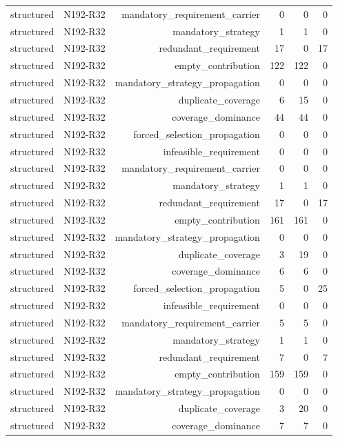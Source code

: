 {\begin{longtable}{lrrrrr}
structured & N192-R32 & mandatory\_requirement\_carrier & 0 & 0 & 0 \\
structured & N192-R32 & mandatory\_strategy & 1 & 1 & 0 \\
structured & N192-R32 & redundant\_requirement & 17 & 0 & 17 \\
structured & N192-R32 & empty\_contribution & 122 & 122 & 0 \\
structured & N192-R32 & mandatory\_strategy\_propagation & 0 & 0 & 0 \\
structured & N192-R32 & duplicate\_coverage & 6 & 15 & 0 \\
structured & N192-R32 & coverage\_dominance & 44 & 44 & 0 \\
structured & N192-R32 & forced\_selection\_propagation & 0 & 0 & 0 \\
structured & N192-R32 & infeasible\_requirement & 0 & 0 & 0 \\
structured & N192-R32 & mandatory\_requirement\_carrier & 0 & 0 & 0 \\
structured & N192-R32 & mandatory\_strategy & 1 & 1 & 0 \\
structured & N192-R32 & redundant\_requirement & 17 & 0 & 17 \\
structured & N192-R32 & empty\_contribution & 161 & 161 & 0 \\
structured & N192-R32 & mandatory\_strategy\_propagation & 0 & 0 & 0 \\
structured & N192-R32 & duplicate\_coverage & 3 & 19 & 0 \\
structured & N192-R32 & coverage\_dominance & 6 & 6 & 0 \\
structured & N192-R32 & forced\_selection\_propagation & 5 & 0 & 25 \\
structured & N192-R32 & infeasible\_requirement & 0 & 0 & 0 \\
structured & N192-R32 & mandatory\_requirement\_carrier & 5 & 5 & 0 \\
structured & N192-R32 & mandatory\_strategy & 1 & 1 & 0 \\
structured & N192-R32 & redundant\_requirement & 7 & 0 & 7 \\
structured & N192-R32 & empty\_contribution & 159 & 159 & 0 \\
structured & N192-R32 & mandatory\_strategy\_propagation & 0 & 0 & 0 \\
structured & N192-R32 & duplicate\_coverage & 3 & 20 & 0 \\
structured & N192-R32 & coverage\_dominance & 7 & 7 & 0 \\

\end{longtable}}
